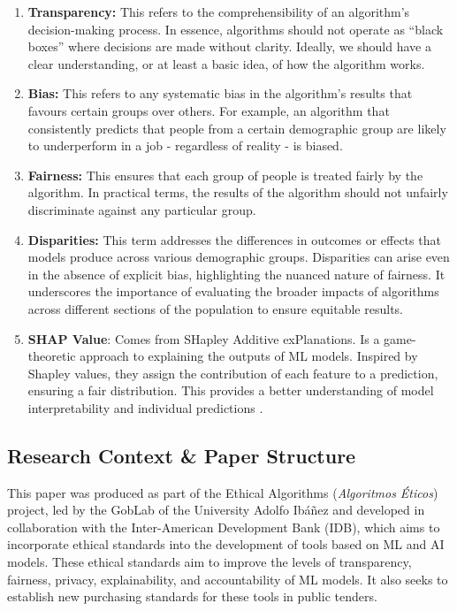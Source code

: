 \documentclass[twoside,11pt]{article}
\begin{document}
\begin{enumerate}
    \item \textbf{Transparency:} This refers to the comprehensibility of an algorithm's decision-making process. In essence, algorithms should not operate as ``black boxes'' where decisions are made without clarity. Ideally, we should have a clear understanding, or at least a basic idea, of how the algorithm works.
    
    \item \textbf{Bias:} This refers to any systematic bias in the algorithm's results that favours certain groups over others. For example, an algorithm that consistently predicts that people from a certain demographic group are likely to underperform in a job - regardless of reality - is biased.
    
    \item \textbf{Fairness:} This ensures that each group of people is treated fairly by the algorithm. In practical terms, the results of the algorithm should not unfairly discriminate against any particular group.

    \item \textbf{Disparities:} This term addresses the differences in outcomes or effects that models produce across various demographic groups. Disparities can arise even in the absence of explicit bias, highlighting the nuanced nature of fairness. It underscores the importance of evaluating the broader impacts of algorithms across different sections of the population to ensure equitable results.

    \item \textbf{SHAP Value}: Comes from SHapley Additive exPlanations. Is a game-theoretic approach to explaining the outputs of ML models. Inspired by Shapley values, they assign the contribution of each feature to a prediction, ensuring a fair distribution. This provides a better understanding of model interpretability and individual predictions .
\end{enumerate}

\subsection{Research Context \& Paper Structure}

This paper was produced as part of the Ethical Algorithms (\textit{Algoritmos Éticos}) project, led by the GobLab of the University Adolfo Ibáñez and developed in collaboration with the Inter-American Development Bank (IDB), which aims to incorporate ethical standards into the development of tools based on ML and AI models. These ethical standards aim to improve the levels of transparency, fairness, privacy, explainability, and accountability of ML models. It also seeks to establish new purchasing standards for these tools in public tenders.
\end{document}

